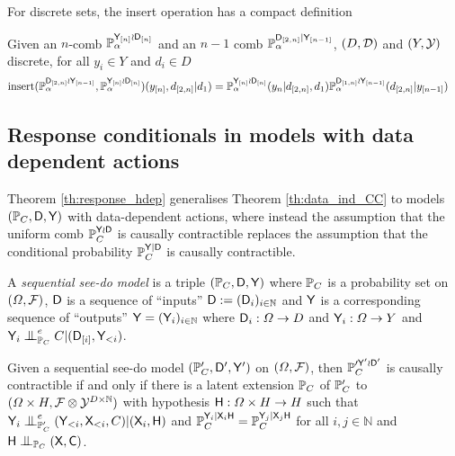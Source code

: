 For discrete sets, the insert operation has a compact definition

\begin{definition}\label{def:insert_discrete}
Given an $n$-comb $\mathbb{P}_\alpha^{\mathsf{Y}_{[n]}\wr \mathsf{D}_{[n]}}$ and an $n-1$ comb $\mathbb{P}_\alpha^{\mathsf{D}_{[2,n]}|\mathsf{Y}_{[n-1]}}$, $(D,\mathcal{D})$ and $(Y,\mathcal{Y})$ discrete, for all $y_i\in Y$ and $d_i\in D$
\begin{align}
    \mathrm{insert}(\mathbb{P}_\alpha^{\mathsf{D}_{[2,n]}\wr \mathsf{Y}_{[n-1]}},\mathbb{P}_\alpha^{\mathsf{Y}_{[n]}\wr \mathsf{D}_{[n]}})(y_{[n]},d_{[2,n]}|d_1) &= \mathbb{P}_\alpha^{\mathsf{Y}_{[n]}\wr \mathsf{D}_{[n]}}(y_n|d_{[2,n]},d_1)\mathbb{P}_\alpha^{\mathsf{D}_{[1,n]}\wr\mathsf{Y}_{[n-1]}}(d_{[2,n]}|y_{[n-1]})
\end{align}
\end{definition}

\subsection{Response conditionals in models with data dependent actions}\label{sec:data_dependent_representation}

Theorem \ref{th:response_hdep} generalises Theorem \ref{th:data_ind_CC} to models $(\mathbb{P}_C,\mathsf{D},\mathsf{Y})$ with data-dependent actions, where instead the assumption that the uniform comb $\mathbb{P}_C^{\mathsf{Y}\wr \mathsf{D}}$ is causally contractible replaces the assumption that the conditional probability $\mathbb{P}_C^{\mathsf{Y}| \mathsf{D}}$ is causally contractible.

\begin{definition}
A \emph{sequential see-do model} is a triple $(\mathbb{P}_C,\mathsf{D},\mathsf{Y})$ where $\mathbb{P}_C$ is a probability set on $(\Omega,\mathcal{F})$, $\mathsf{D}$ is a sequence of ``inputs'' $\mathsf{D}:=(\mathsf{D}_i)_{i\in\mathbb{N}}$ and $\mathsf{Y}$ is a corresponding sequence of ``outputs'' $\mathsf{Y}=(\mathsf{Y}_i)_{i\in\mathbb{N}}$ where $\mathsf{D}_i:\Omega\to D$ and $\mathsf{Y}_i:\Omega\to Y$ and $\RV{Y}_i\CI^e_{\prob{P}_C} C|(\RV{D}_{[i]},\RV{Y}_{<i})$.
\end{definition}

\begin{theorem}[]\label{th:response_hdep}
Given a sequential see-do model $(\mathbb{P}_C',\mathsf{D}',\mathsf{Y}')$ on $(\Omega,\mathcal{F})$, then $\mathbb{P}_C^{\prime \mathsf{Y}'\wr \mathsf{D}'}$ is causally contractible if and only if there is a latent extension $\mathbb{P}_C$ of $\mathbb{P}_C'$ to $(\Omega\times H,\mathcal{F}\otimes\mathcal{Y}^{D\times\mathbb{N}})$ with hypothesis $\mathsf{H}:\Omega\times H\to H$ such that $\RV{Y}_i\CI^e_{\prob{P}_C'} (\RV{Y}_{<i},\RV{X}_{<i},C)|(\RV{X}_i,\RV{H})$ and $\mathbb{P}_C^{\mathsf{Y}_i|\mathsf{X}_i\mathsf{H}}=\mathbb{P}_C^{\mathsf{Y}_j|\mathsf{X}_j\mathsf{H}}$ for all $i,j\in \mathbb{N}$ and $\RV{H}\CI_{\prob{P}_C} (\RV{X},\RV{C})$.
\end{theorem}

